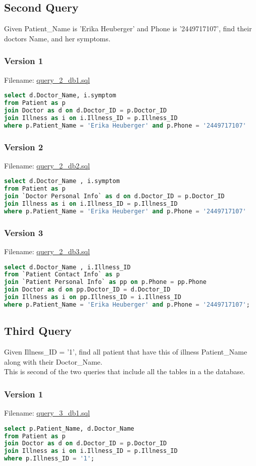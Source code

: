 \documentclass[12pt,arial]{article}
\begin{document}
\subsection{Second Query}
Given Patient\_Name is 'Erika Heuberger' and Phone is '2449717107', find their doctors Name, and her symptoms.

\subsubsection{Version 1}
Filename: \url{query_2_db1.sql}
\begin{lstlisting}[language=SQL]
select d.Doctor_Name, i.symptom
from Patient as p
join Doctor as d on d.Doctor_ID = p.Doctor_ID
join Illness as i on i.Illness_ID = p.Illness_ID
where p.Patient_Name = 'Erika Heuberger' and p.Phone = '2449717107'
\end{lstlisting}
\subsubsection{Version 2}
Filename: \url{query_2_db2.sql}
\begin{lstlisting}[language=SQL]
select d.Doctor_Name , i.symptom
from Patient as p
join `Doctor Personal Info` as d on d.Doctor_ID = p.Doctor_ID
join Illness as i on i.Illness_ID = p.Illness_ID
where p.Patient_Name = 'Erika Heuberger' and p.Phone = '2449717107'
\end{lstlisting}
\subsubsection{Version 3}
Filename: \url{query_2_db3.sql}
\begin{lstlisting}[language=SQL]
select d.Doctor_Name , i.Illness_ID
from `Patient Contact Info` as p
join `Patient Personal Info` as pp on p.Phone = pp.Phone
join Doctor as d on pp.Doctor_ID = d.Doctor_ID
join Illness as i on pp.Illness_ID = i.Illness_ID
where p.Patient_Name = 'Erika Heuberger' and p.Phone = '2449717107';
\end{lstlisting}

\subsection{Third Query}
Given Illness\_ID = '1', find all patient that have this of illness Patient\_Name along with their Doctor\_Name. \\ 
This is second of the two queries that include all the tables in a the database.
\subsubsection{Version 1}
Filename: \url{query_3_db1.sql}
\begin{lstlisting}[language=SQL]
select p.Patient_Name, d.Doctor_Name
from Patient as p
join Doctor as d on d.Doctor_ID = p.Doctor_ID
join Illness as i on i.Illness_ID = p.Illness_ID
where p.Illness_ID = '1';
\end{lstlisting}
\end{document}
